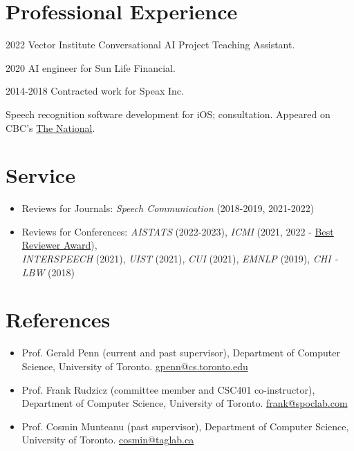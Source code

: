 \documentclass{article}
\begin{document}
\section{Professional Experience}

\begin{CV}
  \item[2022] Vector Institute Conversational AI Project Teaching Assistant.
  \item[2020] AI engineer for Sun Life Financial.
  \item[2014-2018] Contracted work for Speax Inc.

    Speech recognition software development for iOS; consultation. Appeared on
    CBC's \href{https://www.cbc.ca/player/play/1418433091867/}{The National}.

\end{CV}

\section{Service}

\begin{itemize}
  \item Reviews for Journals:%
    \textit{Speech Communication} (2018-2019, 2021-2022)
  \item Reviews for Conferences:%
    \textit{AISTATS} (2022-2023),%
    \textit{ICMI} (2021, 2022 - \href{https://icmi.acm.org/2022/awards/}{Best Reviewer Award}),\\%
    \textit{INTERSPEECH} (2021),%
    \textit{UIST} (2021),%
    \textit{CUI} (2021),%
    \textit{EMNLP} (2019),%
    \textit{CHI - LBW} (2018)%
\end{itemize}

\section{References}

\begin{itemize}
  \item Prof. Gerald Penn (current and past supervisor), Department of
    Computer Science, University of Toronto.
    \href{mailto:gpenn@cs.toronto.edu}{gpenn@cs.toronto.edu}
  \item Prof. Frank Rudzicz (committee member and CSC401 co-instructor),
    Department of Computer Science, University of Toronto.
    \href{mailto:frank@spoclab.com}{frank@spoclab.com}
  \item Prof. Cosmin Munteanu (past supervisor), Department of Computer Science,
    University of Toronto. \href{mailto:cosmin@taglab.ca}{cosmin@taglab.ca}
\end{itemize}
\end{document}
